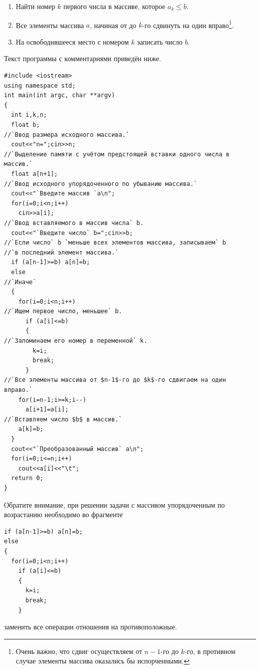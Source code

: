 \begin{enumerate}
\item Найти номер $k$ первого числа в массиве, которое  $a_{k}\le b$.
\item Все элементы массива $a$, начиная от  до $k$-го сдвинуть
на один вправо\footnote{Очень важно, что сдвиг осуществляем от $n-1$-го до $k$-го, в противном случае элементы массива
оказались бы испорченными.}.
\item На освободившееся место с номером $k$ записать число $b$.
\end{enumerate}
Текст программы с комментариями приведён ниже.
\begin{lstlisting}
#include <iostream>
using namespace std;
int main(int argc, char **argv)
{
  int i,k,n;
  float b;
//`Ввод размера исходного массива.`
  cout<<"n=";cin>>n;
//`Выделение памяти с учётом предстоящей вставки одного числа в массив.`
  float a[n+1];
//`Ввод исходного упорядоченного по убыванию массива.`
  cout<<"`Введите массив `a\n";
  for(i=0;i<n;i++)
    cin>>a[i];
//`Ввод вставляемого в массив числа` b.
  cout<<"`Введите число` b=";cin>>b;
//`Если число` b `меньше всех элементов массива, записываем` b
//`в последний элемент массива.`
  if (a[n-1]>=b) a[n]=b;
  else
//`Иначе`
  {
    for(i=0;i<n;i++)
//`Ищем первое число, меньшее` b.
      if (a[i]<=b)
      {
//`Запоминаем его номер в переменной` k.
        k=i;
        break;
      }
//`Все элементы массива от $n-1$-го до $k$-го сдвигаем на один вправо.`
    for(i=n-1;i>=k;i--)
      a[i+1]=a[i];
//`Вставляем число $b$ в массив.`
    a[k]=b;
  }
  cout<<"`Преобразованный массив` a\n";
  for(i=0;i<=n;i++)
    cout<<a[i]<<"\t";
  return 0;
}
\end{lstlisting}

Обратите внимание, при решении задачи с массивом упорядоченным по возрастанию необходимо во фрагменте
\begin{lstlisting}
if (a[n-1]>=b) a[n]=b;
else
{
  for(i=0;i<n;i++)
    if (a[i]<=b)
    {
      k=i;
      break;
    }
\end{lstlisting}
заменить все операции отношения на противоположные.



